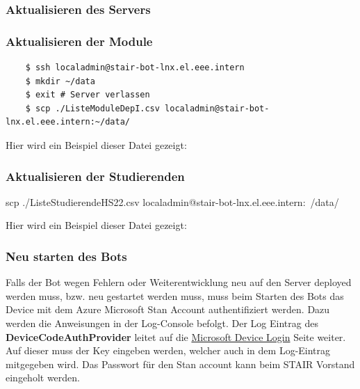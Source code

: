 \documentclass[a4paper, table]{article}
\begin{document}
\subsubsection{Aktualisieren des Servers}


\subsubsection{Aktualisieren der Module}

\begin{verbatim}
    $ ssh localadmin@stair-bot-lnx.el.eee.intern
    $ mkdir ~/data
    $ exit # Server verlassen
    $ scp ./ListeModuleDepI.csv localadmin@stair-bot-lnx.el.eee.intern:~/data/
\end{verbatim}


Hier wird ein Beispiel dieser Datei gezeigt:





\subsubsection{Aktualisieren der Studierenden}


scp ./ListeStudierendeHS22.csv  localadmin@stair-bot-lnx.el.eee.intern:~/data/

Hier wird ein Beispiel dieser Datei gezeigt:





\subsubsection{Neu starten des Bots}
Falls der Bot wegen Fehlern oder Weiterentwicklung neu auf den Server deployed werden muss, \gls{bzw.} neu gestartet werden muss,
muss beim Starten des Bots das Device mit dem Azure Microsoft Stan Account authentifiziert werden.
Dazu werden die Anweisungen in der Log-Console befolgt.
Der Log Eintrag des \textbf{DeviceCodeAuthProvider} leitet auf die \href{https://microsoft.com/devicelogin}{Microsoft Device Login} Seite weiter.
Auf dieser muss der Key eingeben werden, welcher auch in dem Log-Eintrag mitgegeben wird.
Das Passwort für den Stan account kann beim STAIR Vorstand eingeholt werden.
\end{document}
